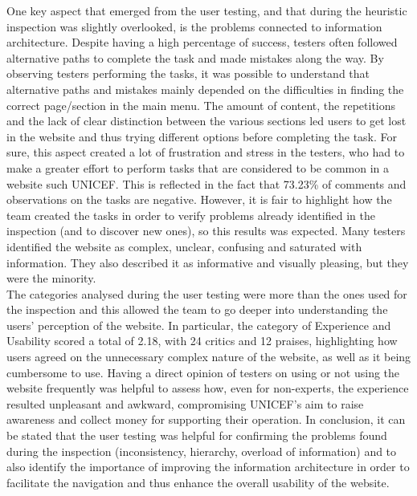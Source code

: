 One key aspect that emerged from the user testing, and that during the heuristic inspection was slightly overlooked, is the problems connected to information architecture. Despite having a high percentage of success, testers often followed alternative paths to complete the task and made mistakes along the way. 
By observing testers performing the tasks, it was possible to understand that alternative paths and mistakes mainly depended on the difficulties in finding the correct page/section in the main menu. The amount of content, the repetitions and the lack of clear distinction between the various sections led users to get lost in the website and thus trying different options before completing the task. 
For sure, this aspect created a lot of frustration and stress in the testers, who had to make a greater effort to perform tasks that are considered to be common in a website such UNICEF. This is reflected in the fact that 73.23\% of comments and observations on the tasks are negative. However, it is fair to highlight how the team created the tasks in order to verify problems already identified in the inspection (and to discover new ones), so this results was expected.
Many testers identified the website as complex, unclear, confusing and saturated with information. They also described it as informative and visually pleasing, but they were the minority.\\

The categories analysed during the user testing were more than the ones used for the inspection and this allowed the team to go deeper into understanding the users' perception of the website. In particular, the category of Experience and Usability scored a total of 2.18, with 24 critics and 12 praises, highlighting how users agreed on the unnecessary complex nature of the website, as well as it being cumbersome to use. 
Having a direct opinion of testers on using or not using the website frequently was helpful to assess how, even for non-experts, the experience resulted unpleasant and awkward, compromising UNICEF's aim to raise awareness and collect money for supporting their operation.
In conclusion, it can be stated that the user testing was helpful for confirming the problems found during the inspection (inconsistency, hierarchy, overload of information) and to also identify the importance of improving the information architecture in order to facilitate the navigation and thus enhance the overall usability of the website.
